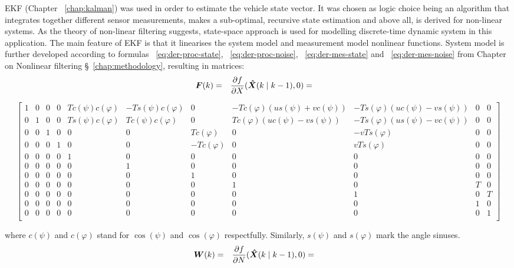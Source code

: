 EKF (Chapter ~\ref{chap:kalman}) was used in order to estimate the vehicle state vector. It was chosen as logic choice being an algorithm that integrates together different sensor measurements, makes a sub-optimal, recursive state estimation and above all, is derived for non-linear systems. As the theory of non-linear filtering suggests, state-space approach is used for modelling discrete-time dynamic system in this application. The main feature of EKF is that it linearises the system model and measurement model nonlinear functions. System model is further developed according to formulas ~\ref{eq:der-proc-state}, ~\ref{eq:der-proc-noise}, ~\ref{eq:der-mes-state} and ~\ref{eq:der-mes-noise} from Chapter on Nonlinear filtering \S~\ref{chap:methodology}, resulting in matrices:
\begin{align*}
\boldsymbol{F}(k) & = &  \frac{\partial f}{\partial X} (\boldsymbol{\hat{X}}(k \mid k-1), 0) & = & 
\end{align*}
\begin{footnotesize}
$$ \left[ 
\begin{array}{ccccccccccc}
1 & 0 & 0 & 0 & T c(\psi) c(\varphi) & -T s(\psi) c(\varphi) & 0 & -Tc(\varphi)(us(\psi)+vc(\psi)) & -Ts(\varphi)(uc(\psi)-vs(\psi)) & 0 & 0 \\
0 & 1 & 0 & 0 & T s(\psi) c(\varphi) & T c(\psi) c(\varphi) & 0 & Tc(\varphi)(uc(\psi)-vs(\psi)) & -Ts(\varphi)(us(\psi)-vc(\psi))  & 0 & 0 \\
0 & 0 & 1 & 0 & 0 & 0 &  Tc(\varphi) & 0 & -vTs(\varphi) & 0 & 0 \\
0 & 0 & 0 & 1 & 0 & 0 & -Tc(\varphi) & 0 &  vTs(\varphi) & 0 & 0 \\
0 & 0 & 0 & 0 & 1 & 0 & 0 & 0 & 0 & 0 & 0 \\
0 & 0 & 0 & 0 & 0 & 1 & 0 & 0 & 0 & 0 & 0 \\
0 & 0 & 0 & 0 & 0 & 0 & 1 & 0 & 0 & 0 & 0 \\
0 & 0 & 0 & 0 & 0 & 0 & 0 & 1 & 0 & T & 0 \\
0 & 0 & 0 & 0 & 0 & 0 & 0 & 0 & 1 & 0 & T \\
0 & 0 & 0 & 0 & 0 & 0 & 0 & 0 & 0 & 1 & 0 \\
0 & 0 & 0 & 0 & 0 & 0 & 0 & 0 & 0 & 0 & 1 \\
\end{array}
\right] $$ 
\end{footnotesize}
where $c(\psi)$ and $c(\varphi)$ stand for $\cos(\psi)$ and $\cos(\varphi)$ respectfully. Similarly, $s(\psi)$ and $s(\varphi)$ mark the angle sinuses.  
\begin{align*}
\boldsymbol{W}(k) & = & \frac{\partial f}{\partial N} (\boldsymbol{\hat{X}}(k \mid k-1), 0) & = &
\end{align*}
